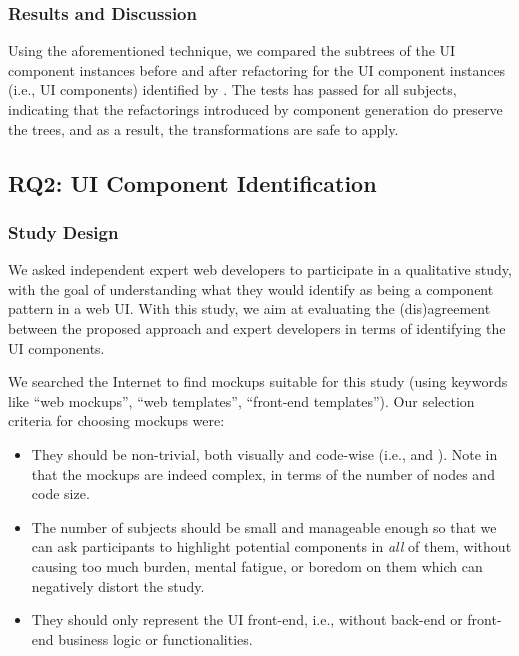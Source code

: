 \subsubsection{Results and Discussion}
Using the aforementioned technique, 
we compared the \dom subtrees of the UI component instances
before and after refactoring for the \totalNumberOfComponentInstances UI component instances 
(i.e., \numberOfComponents UI components) identified by \toolname.
The tests has passed for all subjects,
indicating that the refactorings introduced by component generation do 
preserve the \dom trees,
and as a result, the transformations are safe to apply.


\subsection{RQ2: UI Component Identification}

\subsubsection{Study Design} 
\label{sec:study-design}

We asked independent expert web developers to participate in a qualitative study,
with the goal of understanding what they would identify as
being a component pattern in a web UI. 
With this study, we aim at evaluating the (dis)agreement between the proposed approach and expert developers in terms of identifying the UI components.



We searched the Internet to find mockups suitable for this study
(using keywords like ``web mockups'', ``web templates'', ``front-end templates'').
Our selection criteria for choosing mockups were:

\begin{itemize}[leftmargin=*]
	\item They should be non-trivial, both visually 
	and code-wise (i.e., \html and \css).
	Note in  that
	the mockups are indeed complex,
	in terms of the number of \dom nodes and \css code size.
		
\item The number of subjects should be small and manageable enough	
	so that we can ask participants to highlight potential components 
	in \emph{all} of them,
	without causing too much burden, mental fatigue, or boredom on them
	which can negatively distort the study.

	\item They should only represent the UI front-end,
	i.e., without back-end or front-end business logic or functionalities.
\end{itemize}

